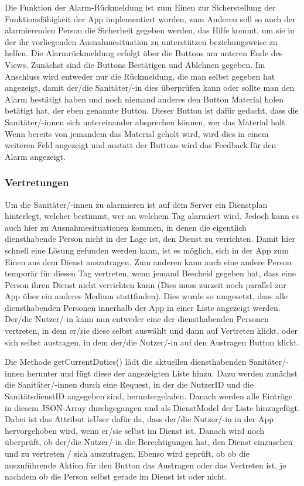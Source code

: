     \noindent Die Funktion der Alarm-Rückmeldung ist zum Einen zur Sicherstellung der
    Funktionsfähigkeit der App implementiert worden, zum Anderen soll so auch der 
    alarmierenden Person die Sicherheit gegeben werden, das Hilfe kommt, um sie in der 
    ihr vorliegenden Ausnahmesituation zu unterstützen beziehungsweise zu helfen.
    Die Alarmrückmeldung erfolgt über die Buttons am unteren Ende des Views. Zunächst
    sind die Buttons \glqq Bestätigen\grqq{} und \glqq Ablehnen\grqq{} gegeben. Im Anschluss wird
    entweder nur die Rückmeldung, die man selbst gegeben hat angezeigt, damit 
    der/die Sanitäter/-in dies überprüfen kann oder sollte man den Alarm bestätigt 
    haben und noch niemand anderes den Button \glqq Material holen\grqq{} betätigt hat, der eben genannte Button. 
    Dieser Button ist dafür gedacht, dass die Sanitäter/-innen sich untereinander absprechen können, wer das 
    Material holt. Wenn bereits von jemandem das Material 
    geholt wird, wird dies in einem weiteren Feld angezeigt und anstatt der Buttons 
    wird das Feedback für den Alarm angezeigt.

\subsubsection{Vertretungen}
    Um die Sanitäter/-innen zu alarmieren ist auf dem Server ein Dienstplan hinterlegt, 
    welcher bestimmt, wer an welchem Tag alarmiert wird. Jedoch kann es auch hier zu 
    Ausnahmesituationen kommen, in denen die eigentlich diensthabende Person nicht in 
    der Lage ist, den Dienst zu verrichten. Damit hier schnell eine Lösung gefunden 
    werden kann, ist es möglich, sich in der App zum Einen aus dem Dienst auszutragen.
    Zum anderen kann auch eine andere Person temporär für diesen Tag vertreten, wenn jemand  
    Bescheid gegeben hat, dass eine Person ihren Dienst nicht verrichten kann (Dies muss zurzeit noch parallel 
    zur App über ein anderes Medium stattfinden).  
    Dies wurde so umgesetzt, dass alle diensthabenden Personen
    innerhalb der App in einer Liste angezeigt werden. Der/die Nutzer/-in kann nun entweder 
    eine der diensthabenden Personen vertreten, in dem er/sie diese selbst auswählt und dann 
    auf \glqq Vertreten\grqq{} klickt, oder sich selbst austragen, in dem der/die Nutzer/-in auf den 
    \glqq Austragen \grqq Button klickt.

    Die Methode getCurrentDuties() lädt die aktuellen diensthabenden Sanitäter/-innen 
    herunter und fügt diese der angezeigten Liste hinzu. Dazu werden zunächst die 
    Sanitäter/-innen durch eine Request, in der die NutzerID und die SanitätsdienstID
    angegeben sind, heruntergeladen. Danach werden alle Einträge in diesem \glqq JSON-Array\grqq{} 
    durchgegangen und als DienstModel der Liste hinzugefügt. Dabei ist das Attribut 
    isUser dafür da, dass der/die Nutzer/-in in der App hervorgehoben wird, wenn er/sie 
    selbst im Dienst ist. Danach wird noch überprüft, ob der/die Nutzer/-in die 
    Berechtigungen hat, den Dienst einzusehen und zu vertreten / sich auszutragen. Ebenso wird geprüft, ob
    ob die auszuführende Aktion für den Button das Austragen oder das Vertreten ist, 
    je nachdem ob die Person selbst gerade im Dienst ist oder nicht.


